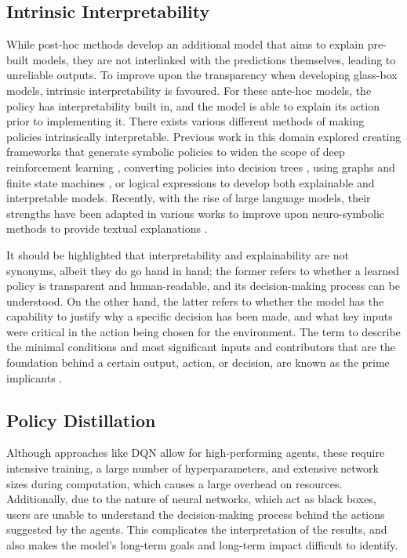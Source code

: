 \subsection{Intrinsic Interpretability}

While post-hoc methods develop an additional model that aims to explain pre-built models, they are not interlinked with the predictions themselves, leading to unreliable outputs. To improve upon the transparency when developing glass-box models, intrinsic interpretability is favoured. For these ante-hoc models, the policy has interpretability built in, and the model is able to explain its action prior to implementing it. There exists various different methods of making policies intrinsically interpretable. Previous work in this domain explored creating frameworks that generate symbolic policies to widen the scope of deep reinforcement learning \cite{zheng2024symbolic, landajuela2021discovering}, converting policies into decision trees \cite{topin2021iterative}, using graphs and finite state machines \cite{koul2018learning}, or logical expressions to develop both explainable and interpretable models. Recently, with the rise of large language models, their strengths have been adapted in various works to improve upon neuro-symbolic methods to provide textual explanations \cite{luo2024end}.

It should be highlighted that interpretability and explainability are not synonyms, albeit they do go hand in hand; the former refers to whether a learned policy is transparent and human-readable, and its decision-making process can be understood. On the other hand, the latter refers to whether the model has the capability to justify why a specific decision has been made, and what key inputs were critical in the action being chosen for the environment. The term to describe the minimal conditions and most significant inputs and contributors that are the foundation behind a certain output, action, or decision, are known as the prime implicants \cite{willot2023prime}. 

\subsection{Policy Distillation}

Although approaches like DQN allow for high-performing agents, these require intensive training, a large number of hyperparameters, and extensive network sizes during computation, which causes a large overhead on resources. Additionally, due to the nature of neural networks, which act as black boxes, users are unable to understand the decision-making process behind the actions suggested by the agents. This complicates the interpretation of the results, and also makes the model's long-term goals and long-term impact difficult to identify. 

